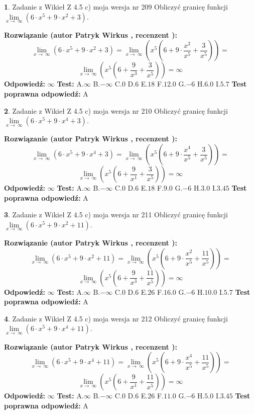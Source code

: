 \documentclass[12pt, a4paper]{article}
\theoremstyle{definition} %
\newtheorem{zad}{}
\newcommand{\zadStart}[1]{\begin{zad}#1\newline}
\newcommand{\zadStop}{\end{zad}}
\newcommand{\rozwStart}[2]{\noindent \textbf{Rozwiązanie (autor #1 , recenzent #2): }\newline}
\newcommand{\rozwStop}{\newline}
\newcommand{\odpStart}{\noindent \textbf{Odpowiedź:}\newline}
\newcommand{\odpStop}{\newline}
\newcommand{\testStart}{\noindent \textbf{Test:}\newline}
\newcommand{\testStop}{\newline}
\newcommand{\kluczStart}{\noindent \textbf{Test poprawna odpowiedź:}\newline}
\newcommand{\kluczStop}{\newline}
\begin{document}
\zadStart{Zadanie z Wikieł Z 4.5 c) moja wersja nr 209}
Obliczyć granicę funkcji  $\lim\limits_{x\to\ \infty}(6 \cdot x^{5}+9 \cdot x^{2}+3)$.
\zadStop
\rozwStart{Patryk Wirkus}{}
$$\lim\limits_{x\to\ \infty}(6 \cdot x^{5}+9 \cdot x^{2}+3) = \lim\limits_{x\to\ \infty}(x^{5}(6 +9 \cdot \frac{x^{2}}{x^{5}}+\frac{3}{x^{5}})) =$$ $$\lim\limits_{x\to\ \infty}(x^{5}(6 +\frac{9}{x^{3}}+\frac{3}{x^{5}})) =\infty$$
\rozwStop
\odpStart
$\infty$
\odpStop
\testStart
A.$\infty$ B.$-\infty$ C.$0$ D.$6$ E.$18$
F.$12.0$ G.$-6$
H.$6.0$
I.$5.7$
\testStop
\kluczStart
A
\kluczStop



\zadStart{Zadanie z Wikieł Z 4.5 c) moja wersja nr 210}
Obliczyć granicę funkcji  $\lim\limits_{x\to\ \infty}(6 \cdot x^{5}+9 \cdot x^{4}+3)$.
\zadStop
\rozwStart{Patryk Wirkus}{}
$$\lim\limits_{x\to\ \infty}(6 \cdot x^{5}+9 \cdot x^{4}+3) = \lim\limits_{x\to\ \infty}(x^{5}(6 +9 \cdot \frac{x^{4}}{x^{5}}+\frac{3}{x^{5}})) =$$ $$\lim\limits_{x\to\ \infty}(x^{5}(6 +\frac{9}{x^{1}}+\frac{3}{x^{5}})) =\infty$$
\rozwStop
\odpStart
$\infty$
\odpStop
\testStart
A.$\infty$ B.$-\infty$ C.$0$ D.$6$ E.$18$
F.$9.0$ G.$-6$
H.$3.0$
I.$3.45$
\testStop
\kluczStart
A
\kluczStop



\zadStart{Zadanie z Wikieł Z 4.5 c) moja wersja nr 211}
Obliczyć granicę funkcji  $\lim\limits_{x\to\ \infty}(6 \cdot x^{5}+9 \cdot x^{2}+11)$.
\zadStop
\rozwStart{Patryk Wirkus}{}
$$\lim\limits_{x\to\ \infty}(6 \cdot x^{5}+9 \cdot x^{2}+11) = \lim\limits_{x\to\ \infty}(x^{5}(6 +9 \cdot \frac{x^{2}}{x^{5}}+\frac{11}{x^{5}})) =$$ $$\lim\limits_{x\to\ \infty}(x^{5}(6 +\frac{9}{x^{3}}+\frac{11}{x^{5}})) =\infty$$
\rozwStop
\odpStart
$\infty$
\odpStop
\testStart
A.$\infty$ B.$-\infty$ C.$0$ D.$6$ E.$26$
F.$16.0$ G.$-6$
H.$10.0$
I.$5.7$
\testStop
\kluczStart
A
\kluczStop



\zadStart{Zadanie z Wikieł Z 4.5 c) moja wersja nr 212}
Obliczyć granicę funkcji  $\lim\limits_{x\to\ \infty}(6 \cdot x^{5}+9 \cdot x^{4}+11)$.
\zadStop
\rozwStart{Patryk Wirkus}{}
$$\lim\limits_{x\to\ \infty}(6 \cdot x^{5}+9 \cdot x^{4}+11) = \lim\limits_{x\to\ \infty}(x^{5}(6 +9 \cdot \frac{x^{4}}{x^{5}}+\frac{11}{x^{5}})) =$$ $$\lim\limits_{x\to\ \infty}(x^{5}(6 +\frac{9}{x^{1}}+\frac{11}{x^{5}})) =\infty$$
\rozwStop
\odpStart
$\infty$
\odpStop
\testStart
A.$\infty$ B.$-\infty$ C.$0$ D.$6$ E.$26$
F.$11.0$ G.$-6$
H.$5.0$
I.$3.45$
\testStop
\kluczStart
A
\kluczStop
\end{document}

